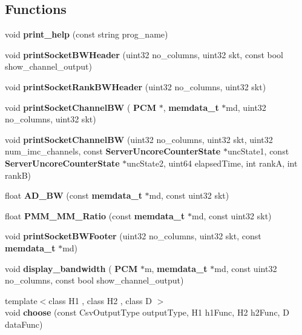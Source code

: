 \subsection*{Functions}
\begin{DoxyCompactItemize}
\item 
\mbox{\label{pcm-memory_8cpp_aed15bac2c898efcc1f005764539f7970}} 
void {\bfseries print\+\_\+help} (const string prog\+\_\+name)
\item 
\mbox{\label{pcm-memory_8cpp_a6670ccde5cf07eff1feca47d6f52495a}} 
void {\bfseries print\+Socket\+B\+W\+Header} (uint32 no\+\_\+columns, uint32 skt, const bool show\+\_\+channel\+\_\+output)
\item 
\mbox{\label{pcm-memory_8cpp_a64347d4f792e8aa01f984c6205cfdb23}} 
void {\bfseries print\+Socket\+Rank\+B\+W\+Header} (uint32 no\+\_\+columns, uint32 skt)
\item 
\mbox{\label{pcm-memory_8cpp_ae4e91d340ca286f4fcb49f65a8016e4c}} 
void {\bfseries print\+Socket\+Channel\+BW} (\textbf{ P\+CM} $\ast$, \textbf{ memdata\+\_\+t} $\ast$md, uint32 no\+\_\+columns, uint32 skt)
\item 
\mbox{\label{pcm-memory_8cpp_a5513d4ffa4ff30563a2469fa2abb4247}} 
void {\bfseries print\+Socket\+Channel\+BW} (uint32 no\+\_\+columns, uint32 skt, uint32 num\+\_\+imc\+\_\+channels, const \textbf{ Server\+Uncore\+Counter\+State} $\ast$unc\+State1, const \textbf{ Server\+Uncore\+Counter\+State} $\ast$unc\+State2, uint64 elapsed\+Time, int rankA, int rankB)
\item 
\mbox{\label{pcm-memory_8cpp_a0bd6ec5203333f7f22726db681f86b36}} 
float {\bfseries A\+D\+\_\+\+BW} (const \textbf{ memdata\+\_\+t} $\ast$md, const uint32 skt)
\item 
\mbox{\label{pcm-memory_8cpp_a7934ceba3070d2d9abb0622b9fca6dc4}} 
float {\bfseries P\+M\+M\+\_\+\+M\+M\+\_\+\+Ratio} (const \textbf{ memdata\+\_\+t} $\ast$md, const uint32 skt)
\item 
\mbox{\label{pcm-memory_8cpp_a647b83f926837f6d568125cefa4dc99b}} 
void {\bfseries print\+Socket\+B\+W\+Footer} (uint32 no\+\_\+columns, uint32 skt, const \textbf{ memdata\+\_\+t} $\ast$md)
\item 
\mbox{\label{pcm-memory_8cpp_a26bfc03a155045b79523809b705657ab}} 
void {\bfseries display\+\_\+bandwidth} (\textbf{ P\+CM} $\ast$m, \textbf{ memdata\+\_\+t} $\ast$md, const uint32 no\+\_\+columns, const bool show\+\_\+channel\+\_\+output)
\item 
\mbox{\label{pcm-memory_8cpp_a2d4fe7eebcd1e3d8f246aeadd4d2704f}} 
{\footnotesize template$<$class H1 , class H2 , class D $>$ }\\void {\bfseries choose} (const Csv\+Output\+Type output\+Type, H1 h1\+Func, H2 h2\+Func, D data\+Func)

\end{DoxyCompactItemize}
